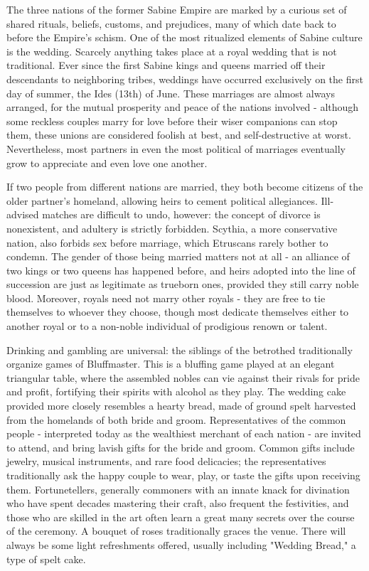 \documentclass[blue]{Kos}
\begin{document}
\name{\bSabine{}}

The three nations of the former Sabine Empire are marked by a curious set of shared rituals, beliefs, customs, and prejudices, many of which date back to before the Empire's schism. One of the most ritualized elements of Sabine culture is the wedding. Scarcely anything takes place at a royal wedding that is not traditional. Ever since the first Sabine kings and queens married off their descendants to neighboring tribes, weddings have occurred exclusively on the first day of summer, the Ides (13th) of June. These marriages are almost always arranged, for the mutual prosperity and peace of the nations involved - although some reckless couples marry for love before their wiser companions can stop them, these unions are considered foolish at best, and self-destructive at worst. Nevertheless, most partners in even the most political of marriages eventually grow to appreciate and even love one another.

If two people from different nations are married, they both become citizens of the older partner's homeland, allowing heirs to cement political allegiances. Ill-advised matches are difficult to undo, however: the concept of divorce is nonexistent, and adultery is strictly forbidden. Scythia, a more conservative nation, also forbids sex before marriage, which Etruscans rarely bother to condemn. The gender of those being married matters not at all - an alliance of two kings or two queens has happened before, and heirs adopted into the line of succession are just as legitimate as trueborn ones, provided they still carry noble blood. Moreover, royals need not marry other royals - they are free to tie themselves to whoever they choose, though most dedicate themselves either to another royal or to a non-noble individual of prodigious renown or talent.

Drinking and gambling are universal: the siblings of the betrothed traditionally organize games of Bluffmaster. This is a bluffing game played at an elegant triangular table, where the assembled nobles can vie against their rivals for pride and profit, fortifying their spirits with alcohol as they play. The wedding cake provided more closely resembles a hearty bread, made of ground spelt harvested from the homelands of both bride and groom. Representatives of the common people - interpreted today as the wealthiest merchant of each nation - are invited to attend, and bring lavish gifts for the bride and groom. Common gifts include jewelry, musical instruments, and rare food delicacies; the representatives traditionally ask the happy couple to wear, play, or taste the gifts upon receiving them. Fortunetellers, generally commoners with an innate knack for divination who have spent decades mastering their craft, also frequent the festivities, and those who are skilled in the art often learn a great many secrets over the course of the ceremony. A bouquet of roses traditionally graces the venue. There will always be some light refreshments offered, usually including "Wedding Bread," a type of spelt cake.
\end{document}
